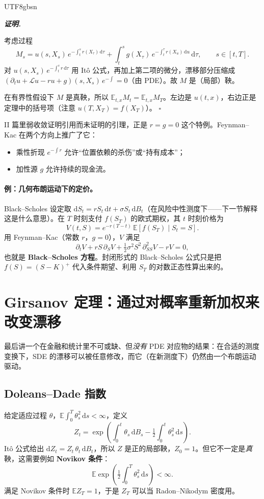\documentclass{article}
\newenvironment{proof}[1][证明]{%
  \par\smallskip\noindent\textit{\textbf{#1.}}\quad\ignorespaces
}{%
  \hfill$\square$\par\smallskip
}
\theoremstyle{plain}
\theoremstyle{definition}
\begin{document}
\begin{CJK*}{UTF8}{gbsn}
\begin{proof}
考虑过程
\[
  M_s=u(s,X_s)\,e^{-\int_t^s r(X_\tau)\,\mathrm{d}\tau}+\int_t^s g(X_\tau)\,e^{-\int_t^\tau r(X_u)\,\mathrm{d}u}\,\mathrm{d}\tau,\qquad s\in[t,T].
\]
对 $u(s,X_s)\,e^{-\int_t^s r\,\mathrm{d}\tau}$ 用 It\^o 公式，再加上第二项的微分，漂移部分压缩成 $(\partial_t u+\mathcal{L}u-ru+g)(s,X_s)\,e^{-\int}=0$（由 PDE）。故 $M$ 是（局部）鞅。

在有界性假设下 $M$ 是真鞅，所以 $\mathbb{E}_{t,x}M_t=\mathbb{E}_{t,x}M_T$。左边是 $u(t,x)$，右边正是定理中的括号项（注意 $u(T,X_T)=f(X_T)$）。
\end{proof}

II 篇里弱收敛证明引用而未证明的引理，正是 $r=g=0$ 这个特例。Feynman--Kac 在两个方向上推广了它：
\begin{itemize}
    \item 乘性折现 $e^{-\int r}$ 允许“位置依赖的杀伤”或“持有成本”；
    \item 加性源 $g$ 允许持续的现金流。
\end{itemize}

\paragraph{例：几何布朗运动下的定价。}
Black--Scholes 设定取 $\mathrm{d}S_t=rS_t\,\mathrm{d}t+\sigma S_t\,\mathrm{d}B_t$（在风险中性测度下——下一节解释这是什么意思）。在 $T$ 时刻支付 $f(S_T)$ 的欧式期权，其 $t$ 时刻价格为
\[
  V(t,S)=e^{-r(T-t)}\,\mathbb{E}[f(S_T)\mid S_t=S].
\]
用 Feynman--Kac（常数 $r$，$g=0$），$V$ 满足
\[
  \partial_t V+rS\,\partial_S V+\tfrac{1}{2}\sigma^2 S^2\,\partial_{SS}^2 V-rV=0,
\]
也就是 \textbf{Black--Scholes 方程}。封闭形式的 Black--Scholes 公式只是把 $f(S)=(S-K)^+$ 代入条件期望、利用 $S_T$ 的对数正态性算出来的。

\section{Girsanov 定理：通过对概率重新加权来改变漂移}

最后讲一个在金融和统计里不可或缺、但\emph{没有} PDE 对应物的结果：在合适的测度变换下，SDE 的漂移可以被任意修改，而它（在新测度下）仍然由一个布朗运动驱动。

\subsection{Doleans--Dade 指数}

给定适应过程 $\theta$，$\mathbb{E}\!\int_0^T \theta_s^2\,\mathrm{d}s<\infty$，定义
\[
  Z_t=\exp\!\left(\int_0^t\theta_s\,\mathrm{d}B_s-\tfrac{1}{2}\!\int_0^t\theta_s^2\,\mathrm{d}s\right).
\]
It\^o 公式给出 $\mathrm{d}Z_t=Z_t\,\theta_t\,\mathrm{d}B_t$，所以 $Z$ 是正的局部鞅，$Z_0=1$。但它不一定是\emph{真}鞅，这需要例如 \textbf{Novikov 条件}：
\[
  \mathbb{E}\exp\!\left(\tfrac{1}{2}\!\int_0^T\theta_s^2\,\mathrm{d}s\right)<\infty.
\]
满足 Novikov 条件时 $\mathbb{E}Z_T=1$，于是 $Z_T$ 可以当 Radon--Nikodym 密度用。


\end{CJK*}
\end{document}
